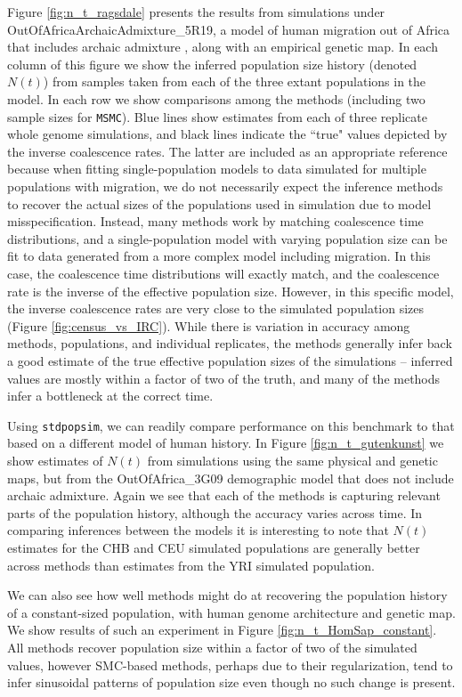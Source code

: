\documentclass[12pt,halfline,a4paper]{ouparticle}
\newcommand{\stdpopsim}{\texttt{stdpopsim}\xspace}
\newcommand{\MSMC}{\texttt{MSMC}\xspace}
\begin{document}
Figure \ref{fig:n_t_ragsdale} presents the results
from simulations under OutOfAfricaArchaicAdmixture\_5R19,
a model of human migration out of Africa that includes archaic admixture
\citep{ragsdale2019models}, along with an empirical genetic map. In each column of this figure
we show the inferred population size history (denoted $N(t)$)
from samples taken from each of the three extant populations in the model.
In each row we show comparisons among the methods (including two sample sizes for \MSMC).
Blue lines show estimates from each of three replicate whole genome simulations,
and black lines indicate the ``true" values depicted by the inverse coalescence rates.
The latter are included as an appropriate reference because
when fitting single-population models to data simulated for multiple
populations with migration, we do not necessarily expect the inference methods to recover the
actual sizes of the populations used in simulation due to model misspecification.
Instead, many methods work by matching coalescence time distributions, and a single-population model
with varying population size can be fit to data generated from a more complex model including migration.
In this case, the coalescence time distributions
will exactly match, and the coalescence rate is the inverse of the effective population size.
However, in this specific model,
the inverse coalescence rates are very close to the simulated population sizes
(Figure \ref{fig:census_vs_IRC}).
While there is variation in accuracy among methods, populations, and individual replicates,
the methods generally infer back a good estimate
of the true effective population sizes of the simulations --
inferred values are mostly within a factor of two of the truth,
and many of the methods infer a bottleneck at the correct time.

Using \stdpopsim, we can readily compare performance on this benchmark to
that based on a different model of human history. In Figure \ref{fig:n_t_gutenkunst} we show estimates of
$N(t)$ from simulations using the same physical and genetic maps, but from the OutOfAfrica\_3G09
demographic model that does not include archaic admixture. Again we see that each
of the methods is capturing relevant parts of the population history, although the
accuracy varies across time. In comparing inferences between the
models it is interesting to note that $N(t)$ estimates for the CHB and CEU
simulated populations are generally better across methods than estimates from the YRI
simulated population.

We can also
see how well methods might do at recovering the population history of a constant-sized population,
with human genome architecture and genetic map.
We show results of such an
experiment in Figure \ref{fig:n_t_HomSap_constant}.
All methods recover population size within a factor of two of the simulated values, however
SMC-based methods, perhaps due to their regularization, tend to infer sinusoidal
patterns of population size even though no such change is present.
\end{document}
